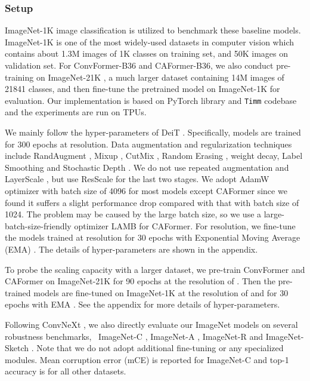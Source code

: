 \subsubsection{Setup} 
ImageNet-1K \cite{imagenet} image classification is utilized to benchmark these baseline models. ImageNet-1K is one of the most widely-used datasets in computer vision which contains about 1.3M images of 1K classes on training set, and 50K images on validation set. For ConvFormer-B36 and CAFormer-B36, we also conduct pre-training on ImageNet-21K \cite{imagenet, imagenet_ijcv}, a much larger dataset containing 14M images of 21841 classes, and then fine-tune the pretrained model on ImageNet-1K for evaluation. Our implementation is based on PyTorch library \cite{paszke2019pytorch} and \texttt{Timm} codebase \cite{rw2019timm} and the experiments are run on TPUs.

We mainly follow the hyper-parameters of DeiT \cite{deit}. Specifically, models are trained for 300 epochs at  resolution. Data augmentation and regularization techniques include RandAugment \cite{cubuk2020randaugment}, Mixup \cite{zhang2017mixup}, CutMix \cite{yun2019cutmix}, Random Erasing \cite{zhong2020random}, weight decay, Label Smoothing \cite{szegedy2016rethinking} and Stochastic Depth \cite{huang2016deep}. We do not use repeated augmentation \cite{berman2019multigrain, hoffer2020augment} and LayerScale \cite{cait}, but use ResScale \cite{shleifer2021normformer} for the last two stages. We adopt AdamW \cite{kingma2014adam, loshchilov2017decoupled} optimizer with batch size of 4096 for most models except CAFormer since 
we found it suffers a slight performance drop compared with that with batch size of 1024.
The problem may be caused by the large batch size, so we use a large-batch-size-friendly optimizer LAMB \cite{you2019large} for CAFormer. For  resolution, we fine-tune the models trained at 
resolution for 30 epochs with Exponential Moving Average (EMA) \cite{ema}. The details of hyper-parameters are shown in the appendix. 

 To probe the scaling capacity with a larger dataset, we pre-train ConvFormer and CAFormer on ImageNet-21K for 90 epochs at the resolution of . Then the pre-trained models are fine-tuned on ImageNet-1K at the resolution of  and  for 30 epochs with EMA \cite{ema}. See the appendix for more details of hyper-parameters.


Following ConvNeXt \cite{convnext}, we also directly evaluate our
ImageNet models on several robustness benchmarks, \ie~ImageNet-C \cite{imagenet-c}, ImageNet-A \cite{imagenet-a}, ImageNet-R \cite{imagenet-r} and ImageNet-Sketch \cite{imagenet-sketch}. Note that we do not adopt additional fine-tuning or any specialized modules. Mean corruption error
(mCE) is reported for ImageNet-C and top-1 accuracy is for all other datasets.




